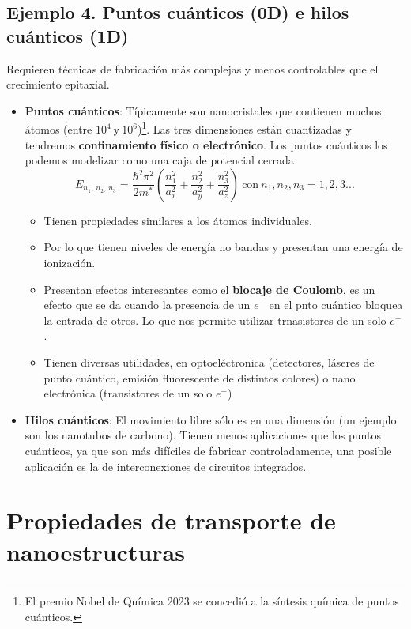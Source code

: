 \subsection{Ejemplo 4. Puntos cuánticos (0D) e hilos cuánticos (1D)}
Requieren técnicas de fabricación más complejas y menos controlables que el crecimiento epitaxial.
\begin{itemize}
    \item \textbf{Puntos cuánticos}: Típicamente son nanocristales que contienen muchos átomos (entre $10^4 \ \text{y} \ 10^6$)\footnote{El premio Nobel de Química 2023 se concedió a la síntesis química de puntos cuánticos.}. Las tres dimensiones están cuantizadas y tendremos \textbf{confinamiento físico o electrónico}. Los puntos cuánticos los podemos modelizar como una caja de potencial cerrada
    \begin{equation}
        E_{n_1, \, n_2, \, n_3 }=\frac{\hbar^2 \pi^2}{2m^*}\left(\frac{n_1^2}{a_x^2}+\frac{n_2^2}{a_y^2}+\frac{n_3^2}{a_z^2} \right) \ \text{con} \ n_1,n_2,n_3=1,2,3...
    \end{equation}
    \begin{itemize}
        \item Tienen propiedades similares a los átomos individuales.
        \item Por lo que tienen niveles de energía no bandas y presentan una energía de ionización.
        \item Presentan efectos interesantes como el \textbf{blocaje de Coulomb}, es un efecto que se da cuando la presencia de un $e^-$ en el pnto cuántico bloquea la entrada de otros. Lo que nos permite utilizar trnasistores de un solo $e^-$.
        \item Tienen diversas utilidades, en optoeléctronica (detectores, láseres de punto cuántico, emisión fluorescente de distintos colores) o nano electrónica (transistores de un solo $e^-$)
    \end{itemize}
    \newpage
    \item \textbf{Hilos cuánticos}: El movimiento libre sólo es en una dimensión (un ejemplo son los nanotubos de carbono). Tienen menos aplicaciones que los puntos cuánticos, ya que son más difíciles de fabricar controladamente, una posible aplicación es la de interconexiones de circuitos integrados.
\end{itemize}
\section{Propiedades de transporte de nanoestructuras}
